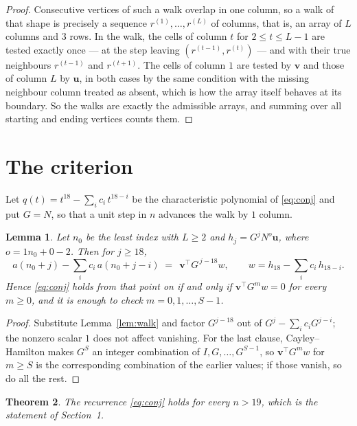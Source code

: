 \documentclass[11pt,a4paper]{article}
\theoremstyle{plain}
\newtheorem{theorem}{Theorem}
\newtheorem{lemma}[theorem]{Lemma}
\theoremstyle{definition}
\begin{document}
\begin{proof}
Consecutive vertices of such a walk overlap in one column, so a walk of that shape is
precisely a sequence $r^{(1)},\dots,r^{(L)}$ of columns, that is, an array of $L$ columns
and $3$ rows. In the walk, the cells of column $t$ for $2\le t\le L-1$ are tested
exactly once --- at the step leaving $(r^{(t-1)},r^{(t)})$ --- and with their true
neighbours $r^{(t-1)}$ and $r^{(t+1)}$. The cells of column $1$ are tested by
$\mathbf{v}$ and those of column $L$ by $\mathbf{u}$, in both cases by the same condition
with the missing neighbour column treated as absent, which is how the array itself behaves at
its boundary. So the walks are exactly the admissible arrays, and summing over all starting
and ending vertices counts them.
\end{proof}

\section{The criterion}

Let $q(t)=t^{18}-\sum_i c_i\,t^{18-i}$ be the characteristic polynomial of
\eqref{eq:conj} and put $G=N$, so that a unit step in $n$ advances the walk by
$1$ column.

\begin{lemma}\label{lem:crit}
Let $n_0$ be the least index with $L\ge2$ and $h_j=G^{j}N^{o}\mathbf{u}$, where
$o=1n_0+0-2$. Then for $j\ge18$,
\[
a(n_0+j)-\sum_i c_i\,a(n_0+j-i)\;=\;\,\mathbf{v}^{\!\top}G^{\,j-18}w,
\qquad w=h_{18}-\sum_i c_i\,h_{18-i} .
\]
Hence \eqref{eq:conj} holds from that point on if and only if
$\mathbf{v}^{\!\top}G^{m}w=0$ for every $m\ge0$, and it is enough to check
$m=0,1,\dots,S-1$.
\end{lemma}

\begin{proof}
Substitute Lemma~\ref{lem:walk} and factor $G^{j-18}$ out of
$G^{j}-\sum_ic_iG^{j-i}$; the nonzero scalar $1$ does not affect
vanishing. For the last clause, Cayley--Hamilton makes $G^{S}$ an integer combination of
$I,G,\dots,G^{S-1}$, so $\mathbf{v}^{\!\top}G^{m}w$ for $m\ge S$ is the corresponding
combination of the earlier values; if those vanish, so do all the rest.
\end{proof}

\begin{theorem}
The recurrence \eqref{eq:conj} holds for every $n>19$, which is the statement of
Section~1.
\end{theorem}
\end{document}
